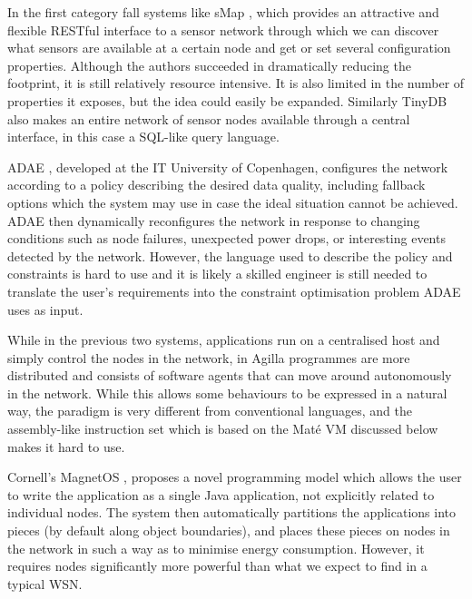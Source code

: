 In the first category fall systems like sMap \cite{DawsonHaggerty:2010eo}, which provides an attractive and flexible RESTful interface to a sensor network through which we can discover what sensors are available at a certain node and get or set several configuration properties. Although the authors succeeded in dramatically reducing the footprint, it is still relatively resource intensive. It is also limited in the number of properties it exposes, but the idea could easily be expanded. Similarly TinyDB \cite{Madden:2005tj} also makes an entire network of sensor nodes available through a central interface, in this case a SQL-like query language.

ADAE \cite{Chang:2010ek}, developed at the IT University of Copenhagen, configures the network according to a policy describing the desired data quality, including fallback options which the system may use in case the ideal situation cannot be achieved. ADAE then dynamically reconfigures the network in response to changing conditions such as node failures, unexpected power drops, or interesting events detected by the network. However, the language used to describe the policy and constraints is hard to use and it is likely a skilled engineer is still needed to translate the user's requirements into the constraint optimisation problem ADAE uses as input.

While in the previous two systems, applications run on a centralised host and simply control the nodes in the network, in Agilla \cite{Fok:2005bh} programmes are more distributed and consists of software agents that can move around autonomously in the network. While this allows some behaviours to be expressed in a natural way, the paradigm is very different from conventional languages, and the assembly-like instruction set which is based on the Maté VM \cite{Levis:2002ku} discussed below makes it hard to use.

Cornell's MagnetOS \cite{Liu:2005wsa}, proposes a novel programming model which allows the user to write the application as a single Java application, not explicitly related to individual nodes. The system then automatically partitions the applications into pieces (by default along object boundaries), and places these pieces on nodes in the network in such a way as to minimise energy consumption. However, it requires nodes significantly more powerful than what we expect to find in a typical WSN.

